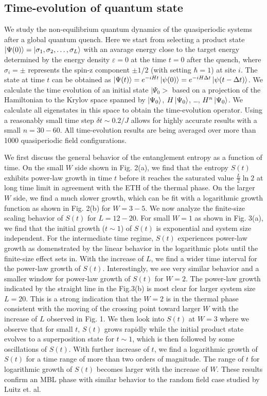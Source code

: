 \documentclass[prl,aps,epsf,showpacs,twocolumn,letterpaper]{revtex4}
\begin{document}
\subsection{Time-evolution of quantum state}


We study the non-equilibrium quantum dynamics of the quasiperiodic systems after a global quantum quench.  Here we start from selecting a product state $\ket{\Psi(0)}=\ket{\sigma_1, \sigma_2, \ldots , \sigma_L}$  
with an avarage energy close to the target energy determined by the energy density $\varepsilon=0$ at the time $t=0$ after the quench, where $\sigma_i=\pm$ represents the spin-z component $\pm 1/2$ (with setting $\hbar=1$)
at site $i$.  The state at time $t$ can be obtained as $\ket{\Psi(t)} = e^{-iHt}\ket{\psi(0)}=e^{-iH\Delta t}\ket{\psi(t-\Delta t)}$. 
  We calculate the time evolution of an initial  state  $|\Psi_0>$ based on  a projection of the Hamiltonian to the Krylov space spanned by $\ket{\Psi_0}$, $H\ket{\Psi_0}$, \ldots, $H^n\ket{\Psi_0}$.
We calculate all eigenstates in this space to obtain the time-evolution operator\cite{luitz2015}.  Using a reasonably small time step $\delta t \sim 0.2/J$ allows for highly accurate results with a small $n=30-60$.  All time-evolution results are being averaged
over more than 1000 quasiperiodic field configurations. 

We first discuss the general behavior of the entanglement entropy as a function of time.  On the small $W$ side shown in Fig. 2(a), we find that the entropy $S(t)$ exhibits power-law growth in time $t$ before it reaches the saturated value $\frac L 2 \ln2$ at long time limit in agreement with the ETH of the thermal phase.  On the larger $W$ side, we find a much slower growth, which can be fit with a logarithmic growth function as shown in Fig. 2(b) for $W=3-5$.  
We now analyze the finite-size scaling behavior of $S(t)$ for $L=12-20$.  For small $W=1$ as shown in Fig. 3(a), we find that the initial growth ($t\sim 1$) of $S(t)$ is exponential and system size independent.  For the intermediate time regime, $S(t)$ experiences power-law growth as domenstrated by the linear behavior in the logarithmic plots until the finite-size effect sets in.  With the increase of $L$, we find a wider time interval for the power-law growth of $S(t)$.  Interestingly, we see very similar behavior and a smaller window for power-law growth of $S(t)$ for $W=2$.  The power-law growth indicated by the straight line in the Fig.3(b) is most clear for larger system size $L=20$.  This is a strong indication that the $W=2$  is in the thermal phase consistent with the moving of the crossing point toward larger $W$ with the increase of $L$ observed in Fig. 1.  We then look into $S(t)$ at $W=3$ where we observe that for small $t$, $S(t)$ grows rapidly  while the initial product state evolves to a superposition state for $t\sim 1$, which is then followed by some oscillations of $S(t)$.  With further increase of $t$, we find a logarithmic growth of $S(t)$ for a time range of more than two orders of magnitude.  The range of $t$ for logarithmic growth of $S(t)$ becomes larger with the increase of $W$.  These results confirm an MBL phase with similar behavior to the random field case studied by Luitz et. al\cite{luitz2015}.  
\end{document}
